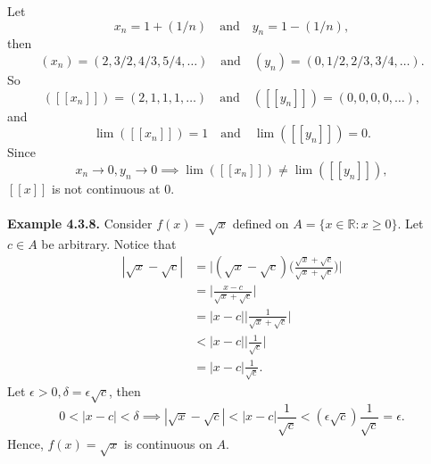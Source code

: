 \documentclass{article}
\begin{document}
            Let 
            \begin{equation*}
                x_n = 1+(1/n) \quad \text{and} \quad y_n=1-(1/n),
            \end{equation*}
            then 
            \begin{equation*}
                (x_n) = (2,3/2,4/3,5/4,\dots) \quad \text{and} \quad (y_n) = (0,1/2,2/3,3/4,\dots).
            \end{equation*}
            So
            \begin{equation*}
                ([[x_n]]) = (2,1,1,1,\dots) \quad \text{and} \quad ([[y_n]])=(0,0,0,0,\dots),
            \end{equation*}
            and
            \begin{equation*}
                \lim([[x_n]]) = 1 \quad \text{and} \quad \lim([[y_n]])=0.
            \end{equation*}
            Since
            \begin{equation*}
                x_n \to 0, y_n \to 0 \implies \lim([[x_n]]) \neq \lim([[y_n]]),
            \end{equation*}
            $[[x]]$ is not continuous at 0.
            \\ \\
            \textbf{Example 4.3.8.} Consider $f(x)=\sqrt{x}$ defined on $A=\{x\in\mathbb{R}:x \geq 0\}$. Let $c \in A$ be arbitrary. Notice that
            \begin{align*}
                |\sqrt{x}-\sqrt{c}| &= \bigg|(\sqrt{x}-\sqrt{c}) \bigg( \frac{\sqrt{x}+\sqrt{c}}{\sqrt{x}+\sqrt{c}}\bigg)\bigg| \\ 
                & = \bigg| \frac{x - c}{\sqrt{x}+\sqrt{c}} \bigg| \\
                & = |x-c| \bigg| \frac{1}{\sqrt{x}+\sqrt{c}} \bigg| \\
                & < |x-c| \bigg| \frac{1}{\sqrt{c}} \bigg| \\
                &= |x-c| \frac{1}{\sqrt{c}}.
            \end{align*}
            Let $\epsilon>0, \delta=\epsilon \sqrt{c}$, then
            \begin{equation*}
                0<|x-c|<\delta \implies |\sqrt{x}-\sqrt{c}| < |x-c|\frac{1}{\sqrt{c}} < (\epsilon \sqrt{c}) \frac{1}{\sqrt{c}} = \epsilon.
            \end{equation*}
            Hence, $f(x) = \sqrt{x}$ is continuous on $A$.
            \\ \\
            
\end{document}
